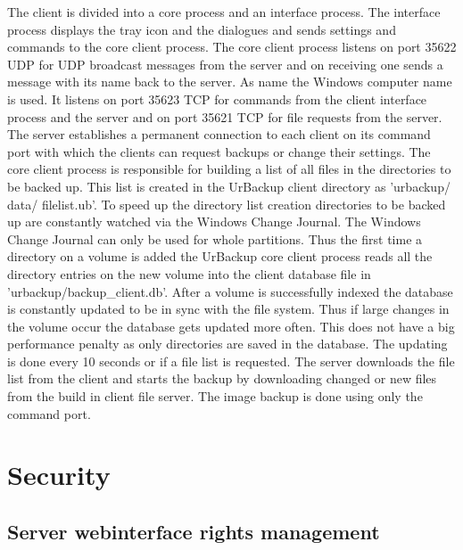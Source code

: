 \documentclass[a4paper,10pt]{article}
\begin{document}
The client is divided into a core process and an interface process. The
interface process displays the tray icon and the dialogues and sends settings and
commands to the core client process. The core client process listens on port
35622 UDP for UDP broadcast messages from the server and on receiving one sends
a message with its name back to the server. As name the Windows computer name is
used. It listens on port 35623 TCP for commands from the client interface
process and the server and on port 35621 TCP for file requests from the server.
The server establishes a permanent connection to each client on its command port
with which the clients can request backups or change their settings. The core
client process is responsible for building a list of all files in the
directories to be backed up. This list is created in the UrBackup client
directory as 'urbackup/ data/ filelist.ub'. To speed up the directory list
creation directories to be backed up are constantly watched via the Windows
Change Journal. The Windows Change Journal can only be used for whole
partitions. Thus the first time a directory on a volume is added the UrBackup
core client process reads all the directory entries on the new volume into the
client database file in 'urbackup/backup\_client.db'. After a volume is
successfully indexed the database is constantly updated to be in sync with the
file system. Thus if large changes in the volume occur the database gets updated
more often. This does not have a big performance penalty as only directories are
saved in the database. The updating is done every 10 seconds or if a file list
is requested. The server downloads the file list from the client and starts the
backup by downloading changed or new files from the build in client file server.
The image backup is done using only the command port.

\section{Security}
\label{sec_security}

\subsection{Server webinterface rights management}
\end{document}
